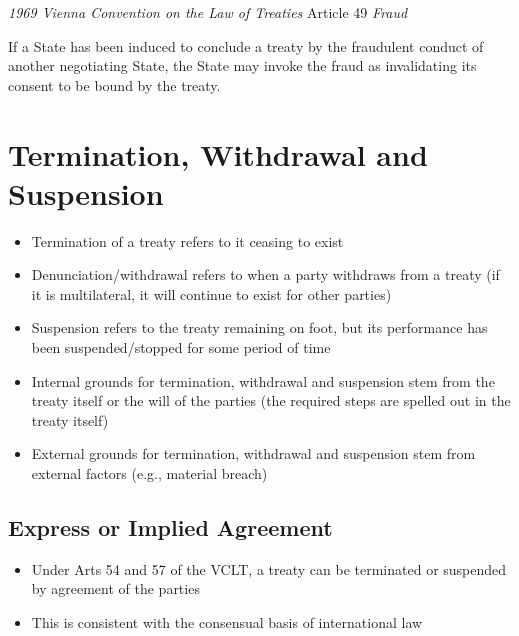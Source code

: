 \begin{conventiondetails}{\textit{1969 Vienna Convention on the Law of Treaties} Article 49}
    \flushleft
    \textit{Fraud}

    \vspace{\baselineskip}

    If a State has been induced to conclude a treaty by the fraudulent conduct of another negotiating  State, the State may invoke the fraud as invalidating its consent to be bound by the treaty.
\end{conventiondetails}

\section{Termination, Withdrawal and Suspension}
\begin{itemize}
    \item Termination of a treaty refers to it ceasing to exist
    \item Denunciation/withdrawal refers to when a party withdraws from a treaty (if it is multilateral, it will continue to exist for other parties)
    \item Suspension refers to the treaty remaining on foot, but its performance has been suspended/stopped for some period of time
    \item Internal grounds for termination, withdrawal and suspension stem from the treaty itself or the will of the parties (the required steps are spelled out in the treaty itself)
    \item External grounds for termination, withdrawal and suspension stem from external factors (e.g., material breach)
\end{itemize}

\subsection{Express or Implied Agreement}
\begin{itemize}
    \item Under Arts 54 and 57 of the VCLT, a treaty can be terminated or suspended by agreement of the parties
    \item This is consistent with the consensual basis of international law
\end{itemize}

